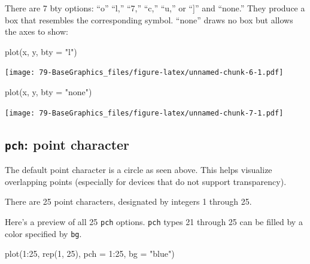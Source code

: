\documentclass[
]{book}
\newenvironment{Shaded}{\begin{snugshade}}{\end{snugshade}}
\newcommand{\AttributeTok}[1]{\textcolor[rgb]{0.77,0.63,0.00}{#1}}
\newcommand{\DecValTok}[1]{\textcolor[rgb]{0.00,0.00,0.81}{#1}}
\newcommand{\FunctionTok}[1]{\textcolor[rgb]{0.00,0.00,0.00}{#1}}
\newcommand{\NormalTok}[1]{#1}
\newcommand{\SpecialCharTok}[1]{\textcolor[rgb]{0.00,0.00,0.00}{#1}}
\newcommand{\StringTok}[1]{\textcolor[rgb]{0.31,0.60,0.02}{#1}}
\begin{document}
There are 7 bty options: ``o'' ``l,'' ``7,'' ``c,'' ``u,'' or ``{]}'' and ``none.''
They produce a box that resembles the corresponding symbol.
``none'' draws no box but allows the axes to show:

\begin{Shaded}
\begin{Highlighting}[]
\FunctionTok{plot}\NormalTok{(x, y, }\AttributeTok{bty =} \StringTok{"l"}\NormalTok{)}
\end{Highlighting}
\end{Shaded}

\texttt{[image: 79-BaseGraphics\_files/figure-latex/unnamed-chunk-6-1.pdf]}

\begin{Shaded}
\begin{Highlighting}[]
\FunctionTok{plot}\NormalTok{(x, y, }\AttributeTok{bty =} \StringTok{"none"}\NormalTok{)}
\end{Highlighting}
\end{Shaded}

\texttt{[image: 79-BaseGraphics\_files/figure-latex/unnamed-chunk-7-1.pdf]}

\hypertarget{pch-point-character}{%
\subsection{\texorpdfstring{\textbf{\texttt{pch}}: point character}{pch: point character}}\label{pch-point-character}}

The default point character is a circle as seen above. This helps visualize overlapping points (especially for devices that do not support transparency).

There are 25 point characters, designated by integers 1 through 25.

Here's a preview of all 25 \texttt{pch} options.
\texttt{pch} types 21 through 25 can be filled by a color specified by \texttt{bg}.

\begin{Shaded}
\begin{Highlighting}[]
\FunctionTok{plot}\NormalTok{(}\DecValTok{1}\SpecialCharTok{:}\DecValTok{25}\NormalTok{, }\FunctionTok{rep}\NormalTok{(}\DecValTok{1}\NormalTok{, }\DecValTok{25}\NormalTok{), }\AttributeTok{pch =} \DecValTok{1}\SpecialCharTok{:}\DecValTok{25}\NormalTok{, }\AttributeTok{bg =} \StringTok{"blue"}\NormalTok{)}
\end{Highlighting}
\end{Shaded}
\end{document}
